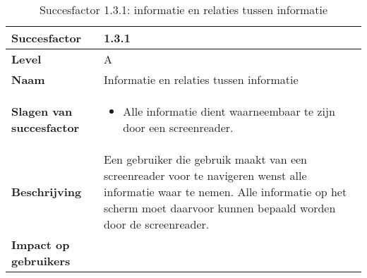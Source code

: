 \newpage
\begin{table}[H]
    \centering
    \caption{Succesfactor 1.3.1: informatie en relaties tussen informatie}
    \hspace*{-1cm}\begin{tabular}{|l|p{12cm}|} 
        \hline
        \textbf{Succesfactor}                & 1.3.1                                                                                                                                                                                                                                                                                                             \\ 
        \hline
        \textbf{Level}                       & A                                                                                                                                                                                                                                                                                                                                                                             \\ 
        \hline
        \textbf{Naam}                        & Informatie en relaties tussen informatie~                                                                                                                                                                                                                                                                                                                                                            \\ 
        \hline
        \textbf{Slagen van succesfactor}     & \begin{itemize}
            \item Alle informatie dient waarneembaar te zijn door een screenreader.
        \end{itemize}                                                                                                                                                                                                                       
        \\ 
        \hline
        \textbf{Beschrijving}                & Een gebruiker die gebruik maakt van een screenreader voor te navigeren wenst alle informatie waar te nemen. Alle informatie op het scherm moet daarvoor kunnen bepaald worden door de screenreader. \\ 
        \hline
        \textbf{Impact op gebruikers}        & 
        \begin{itemize}

\end{itemize}
\end{tabular}
\end{table}
